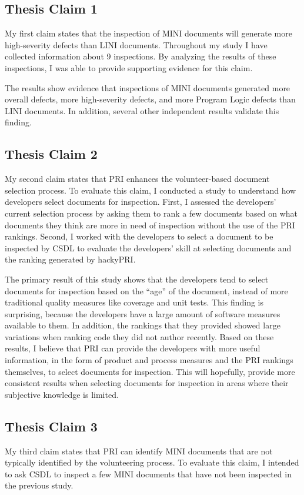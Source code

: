 \subsection{Thesis Claim 1}
My first claim states that the inspection of MINI documents will generate
more high-severity defects than LINI documents. Throughout my study I have
collected information about 9 inspections. By analyzing the results of
these inspections, I was able to provide supporting evidence for this
claim.

The results show evidence that inspections of MINI documents generated more
overall defects, more high-severity defects, and more Program Logic defects
than LINI documents. In addition, several other independent results
validate this finding.

\subsection{Thesis Claim 2}
My second claim states that PRI enhances the volunteer-based document
selection process. To evaluate this claim, I conducted a study to
understand how developers select documents for inspection. First, I
assessed the developers' current selection process by asking them to rank a
few documents based on what documents they think are more in need of
inspection without the use of the PRI rankings. Second, I worked with the
developers to select a document to be inspected by CSDL to evaluate the
developers' skill at selecting documents and the ranking generated by
hackyPRI.

The primary result of this study shows that the developers tend to select
documents for inspection based on the ``age'' of the document, instead of
more traditional quality measures like coverage and unit tests. This
finding is surprising, because the developers have a large amount of
software measures available to them. In addition, the rankings that they
provided showed large variations when ranking code they did not author
recently. Based on these results, I believe that PRI can provide the
developers with more useful information, in the form of product and process
measures and the PRI rankings themselves, to select documents for
inspection. This will hopefully, provide more consistent results when
selecting documents for inspection in areas where their subjective
knowledge is limited.

\subsection{Thesis Claim 3}
My third claim states that PRI can identify MINI documents that are not
typically identified by the volunteering process. To evaluate this claim, I
intended to ask CSDL to inspect a few MINI documents that have not been
inspected in the previous study. 

